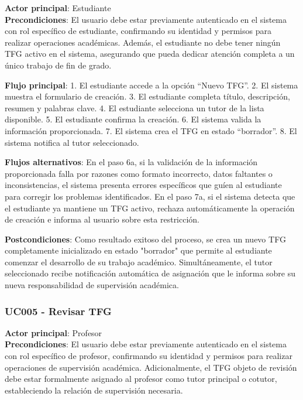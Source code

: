 \documentclass[12pt,a4paper,oneside]{report}
\begin{document}
\textbf{Actor principal}: Estudiante\\
\textbf{Precondiciones}: El usuario debe estar previamente autenticado en el sistema con rol específico de estudiante, confirmando su identidad y permisos para realizar operaciones académicas. Además, el estudiante no debe tener ningún TFG activo en el sistema, asegurando que pueda dedicar atención completa a un único trabajo de fin de grado.

\textbf{Flujo principal}: 1. El estudiante accede a la opción ``Nuevo
TFG''. 2. El sistema muestra el formulario de creación. 3. El estudiante
completa título, descripción, resumen y palabras clave. 4. El estudiante
selecciona un tutor de la lista disponible. 5. El estudiante confirma la
creación. 6. El sistema valida la información proporcionada. 7. El
sistema crea el TFG en estado ``borrador''. 8. El sistema notifica al
tutor seleccionado.

\textbf{Flujos alternativos}: En el paso 6a, si la validación de la información proporcionada falla por razones como formato incorrecto, datos faltantes o inconsistencias, el sistema presenta errores específicos que guíen al estudiante para corregir los problemas identificados. En el paso 7a, si el sistema detecta que el estudiante ya mantiene un TFG activo, rechaza automáticamente la operación de creación e informa al usuario sobre esta restricción.

\textbf{Postcondiciones}: Como resultado exitoso del proceso, se crea un nuevo TFG completamente inicializado en estado "borrador" que permite al estudiante comenzar el desarrollo de su trabajo académico. Simultáneamente, el tutor seleccionado recibe notificación automática de asignación que le informa sobre su nueva responsabilidad de supervisión académica.

\subsubsection{UC005 - Revisar TFG}\label{uc005---revisar-tfg}

\textbf{Actor principal}: Profesor\\
\textbf{Precondiciones}: El usuario debe estar previamente autenticado en el sistema con rol específico de profesor, confirmando su identidad y permisos para realizar operaciones de supervisión académica. Adicionalmente, el TFG objeto de revisión debe estar formalmente asignado al profesor como tutor principal o cotutor, estableciendo la relación de supervisión necesaria.
\end{document}
